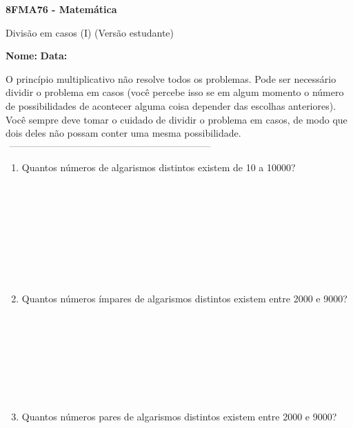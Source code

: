 \documentclass[a4paper,14pt]{article}
\begin{document}
	
	\noindent\textbf{8FMA76 - Matemática} 
	
	\begin{center}Divisão em casos (I) (Versão estudante)
	\end{center}
	
	\noindent\textbf{Nome:} \underline{\hspace{10cm}}
	\noindent\textbf{Data:} \underline{\hspace{4cm}}
	
	
	
    \begin{multicols}{2}
    	\noindent O princípio multiplicativo não resolve todos os problemas. Pode ser necessário dividir o problema em casos (você percebe isso se em algum momento o número de possibilidades de acontecer alguma coisa depender das escolhas anteriores). Você sempre deve tomar o cuidado de dividir o problema em casos, de modo que dois deles não possam conter uma mesma possibilidade.
    	\noindent\textsubscript{~---------------------------------------------------------------------------}
		\begin{enumerate}
			\item Quantos números de algarismos distintos existem de 10 a 10000? \\\\\\\\\\\\\\\\\\
			\item Quantos números ímpares de algarismos distintos existem entre 2000 e 9000? \\\\\\\\\\\\\\\\
			\item Quantos números pares de algarismos distintos existem entre 2000 e 9000? \\\\\\\\\\\\\\\\\\\\\\\\\\\\

\end{enumerate}
\end{multicols}
\end{document}
